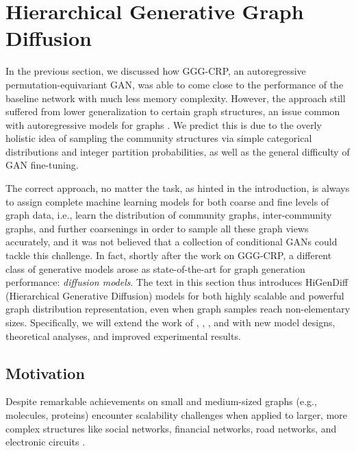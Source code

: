 \section{Hierarchical Generative Graph Diffusion}
\label{sec: higendiff}

In the previous section, we discussed how GGG-CRP, an autoregressive permutation-equivariant GAN, was able to come close to the performance of the baseline network with much less memory complexity. However, the approach still suffered from lower generalization to certain graph structures, an issue common with autoregressive models for graphs \cite{krawczuk_gg-gan_2020}. We predict this is due to the overly holistic idea of sampling the community structures via simple categorical distributions and integer partition probabilities, as well as the general difficulty of GAN fine-tuning. 

The correct approach, no matter the task, as hinted in the introduction, is always to assign complete machine learning models for both coarse and fine levels of graph data, i.e., learn the distribution of community graphs, inter-community graphs, and further coarsenings in order to sample all these graph views accurately, and it was not believed that a collection of conditional GANs could tackle this challenge. In fact, shortly after the work on GGG-CRP, a different class of generative models arose as state-of-the-art for graph generation performance: \emph{diffusion models}. The text in this section thus introduces HiGenDiff (Hierarchical Generative Diffusion) models for both highly scalable and powerful graph distribution representation, even when graph samples reach non-elementary sizes. Specifically, we will extend the work of \cite{vignac_digress_2022}, \cite{karami_higen_2024}, \cite{karami_multi-resolution_2024}, and \cite{krawczuk_graph_2024} with new model designs, theoretical analyses, and improved experimental results.

\subsection{Motivation}
Despite remarkable achievements on small and medium-sized graphs (e.g., molecules, proteins) encounter scalability challenges when applied to larger, more complex structures like social networks, financial networks, road networks, and electronic circuits \cite{krawczuk_graph_2024}. 

